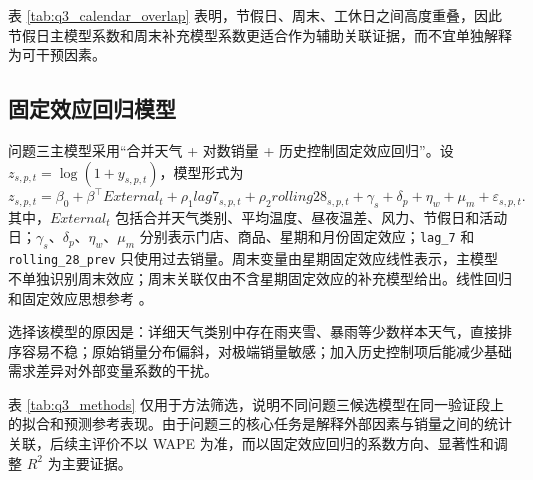 表 \ref{tab:q3_calendar_overlap} 表明，节假日、周末、工休日之间高度重叠，因此节假日主模型系数和周末补充模型系数更适合作为辅助关联证据，而不宜单独解释为可干预因素。

\subsection{固定效应回归模型}

问题三主模型采用“合并天气 + 对数销量 + 历史控制固定效应回归”。设
$z_{s,p,t}=\log(1+y_{s,p,t})$，模型形式为
\begin{equation}
z_{s,p,t}=\beta_0+\beta^\top External_t+\rho_1 lag7_{s,p,t}
+\rho_2 rolling28_{s,p,t}+\gamma_s+\delta_p+\eta_w+\mu_m+\varepsilon_{s,p,t}.
\end{equation}
其中，$External_t$ 包括合并天气类别、平均温度、昼夜温差、风力、节假日和活动日；$\gamma_s$、$\delta_p$、$\eta_w$、$\mu_m$ 分别表示门店、商品、星期和月份固定效应；\texttt{lag\_7} 和 \texttt{rolling\_28\_prev} 只使用过去销量。周末变量由星期固定效应线性表示，主模型不单独识别周末效应；周末关联仅由不含星期固定效应的补充模型给出。线性回归和固定效应思想参考 \cite{montgomery2012regression}。

选择该模型的原因是：详细天气类别中存在雨夹雪、暴雨等少数样本天气，直接排序容易不稳；原始销量分布偏斜，对极端销量敏感；加入历史控制项后能减少基础需求差异对外部变量系数的干扰。

表 \ref{tab:q3_methods} 仅用于方法筛选，说明不同问题三候选模型在同一验证段上的拟合和预测参考表现。由于问题三的核心任务是解释外部因素与销量之间的统计关联，后续主评价不以 WAPE 为准，而以固定效应回归的系数方向、显著性和调整 $R^2$ 为主要证据。

\begin{table}[H]
\centering
\caption{问题三外部因素分析方法验证指标（日滚动一步参考口径）}
\label{tab:q3_methods}
\end{table}

